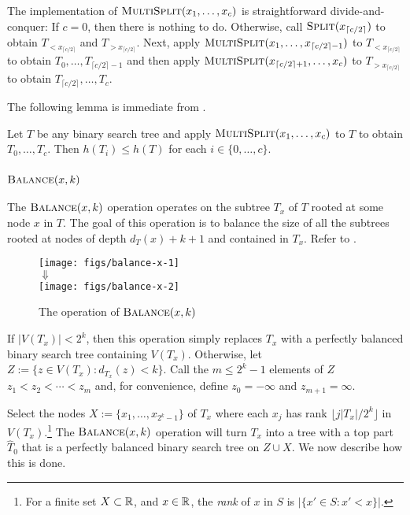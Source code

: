 \documentclass[kpfonts]{patmorin}
\let\le\leqslant
\begin{document}
The implementation of $\textsc{MultiSplit}(x_1,\ldots,x_c)$ is straightforward divide-and-conquer:  If $c=0$, then there is nothing to do.  Otherwise, call $\textsc{Split}(x_{\lceil c/2\rceil})$ to obtain $T_{<x_{\lceil c/2\rceil}}$ and $T_{>x_{\lceil c/2\rceil}}$.  Next, apply $\textsc{MultiSplit}(x_1,\ldots,x_{\lceil c/2\rceil-1})$ to $T_{<x_{\lceil c/2\rceil}}$ to obtain $T_0,\ldots,T_{\lceil c/2\rceil-1}$ and then apply $\textsc{MultiSplit}(x_{\lceil c/2\rceil+1},\ldots,x_c)$ to $T_{>x_{\lceil c/2\rceil}}$ to obtain $T_{\lceil c/2\rceil},\ldots,T_c$.

The following lemma is immediate from .
\begin{lem}
  Let $T$ be any binary search tree and apply $\textsc{MultiSplit}(x_1,\ldots,x_c)$ to $T$ to obtain $T_0,\ldots,T_c$.  Then $h(T_i)\le h(T)$ for each $i\in\{0,\ldots,c\}$.
\end{lem}

\subsubsection{$\textsc{Balance}(x,k)$}

The $\textsc{Balance}(x,k)$ operation operates on the subtree $T_x$ of $T$ rooted at some node $x$ in $T$.
The goal of this operation is to balance the size of all the subtrees rooted at nodes of depth $d_T(x)+k+1$ and contained in $T_x$.
Refer to .

\begin{figure}
    \begin{center}
      \texttt{[image: figs/balance-x-1]} \\[-2ex]
      $\Downarrow$ \\[1ex]
      \texttt{[image: figs/balance-x-2]}
    \end{center}
  \caption{The operation of $\textsc{Balance}(x,k)$}
\end{figure}

If $|V(T_x)|< 2^k$, then this operation simply replaces $T_x$ with a perfectly balanced binary search tree containing $V(T_x)$.  Otherwise, let $Z:=\{z\in V(T_x): d_{T_x}(z)< k\}$.  Call the $m\le 2^k-1$ elements of $Z$  $z_1<z_2<\cdots<z_{m}$ and, for convenience, define $z_0=-\infty$ and $z_{m+1}=\infty$.

Select the nodes $X:=\{x_1,\ldots,x_{2^k-1}\}$ of $T_x$ where each $x_j$ has rank $\lfloor j|T_x|/2^k\rfloor$ in $V(T_x)$.\footnote{For a finite set $X\subset\mathbb{R}$, and $x\in\mathbb{R}$, the \emph{rank} of $x$ in $S$ is $|\{x'\in S: x'<x\}|$.}  The $\textsc{Balance}(x,k)$ operation will turn $T_x$ into a tree with a top part $\hat{T}_0$ that is a perfectly balanced binary search tree on $Z\cup X$.  We now describe how this is done.
\end{document}
